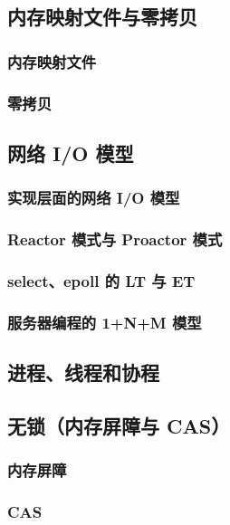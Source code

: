 \documentclass[cn,normal,11pt]{../elegantnote}
\begin{document}
\subsection{内存映射文件与零拷贝}

\subsubsection{内存映射文件}

\subsubsection{零拷贝}

\subsection{网络 I/O 模型}

\subsubsection{实现层面的网络 I/O 模型}

\subsubsection{Reactor 模式与 Proactor 模式}

\subsubsection{select、epoll 的 LT 与 ET}

\subsubsection{服务器编程的 1+N+M 模型}

\subsection{进程、线程和协程}

\subsection{无锁（内存屏障与 CAS）}

\subsubsection{内存屏障}

\subsubsection{CAS}
\end{document}

